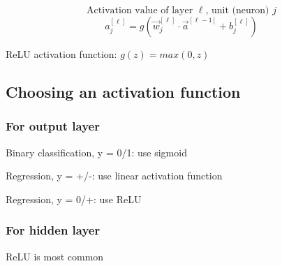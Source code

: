 \documentclass[12pt]{article}
\begin{document}
\[ \text{Activation value of layer $\ell$, unit (neuron) $j$} \]
\[ a_j^{[\ell]} = g(\vec{w}_j^{[\ell]} \cdot \vec{a}^{[\ell - 1]} + b_j^{[\ell]}) \]

ReLU activation function: $g(z) = max(0, z)$

\subsection{Choosing an activation function}

\subsubsection*{For output layer}

Binary classification, y = 0/1: use sigmoid

Regression, y = +/-: use linear activation function

Regression, y = 0/+: use ReLU

\subsubsection*{For hidden layer}

ReLU is most common
\end{document}
